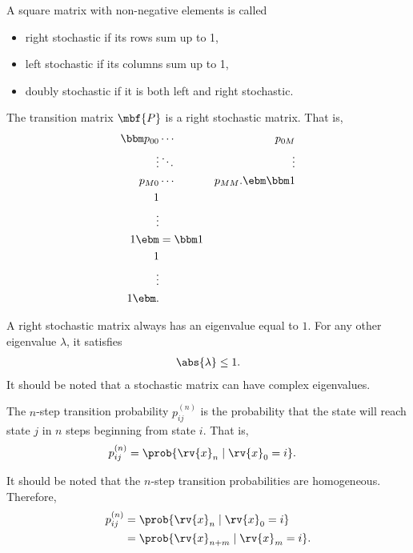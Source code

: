 \begin{definitionBox}
    A square matrix with non-negative elements is called 
    \begin{itemize}
        \item right stochastic if its rows sum up to 1,
        \item left stochastic if its columns sum up to 1,
        \item doubly stochastic if it is both left and right stochastic.
    \end{itemize}
\end{definitionBox}
\begin{property}
    The transition matrix $\mbf{P}$ is a right stochastic matrix. That is,
    \begin{align}
        \bbm p_{00} & \cdots & p_{0M}\\
        \vdots & \ddots & \vdots\\
        p_{M0} & \cdots & p_{MM}.
        \ebm
        \bbm 1\\1\\\vdots\\ 1 \ebm
        &=
        \bbm 1\\1\\\vdots\\1 \ebm.
    \end{align}
\end{property}

\begin{theoremBox}
    A right stochastic matrix always has an eigenvalue equal to $1$. For any other eigenvalue $\lambda$, it satisfies 
    \begin{align}
        \abs{ \lambda} \leq 1.
    \end{align}
    It should be noted that a stochastic matrix can have complex eigenvalues.     
\end{theoremBox}

\begin{definitionBox}
    The $n$-step transition probability $p_{ij}^{(n)}$ is the probability that the state will reach state $j$ in $n$ steps beginning from state $i$. That is,
    \begin{align}
        p_{ij}^{(n)} &= \prob{\rv{x}_{n}\mid \rv{x}_{0}=i}.
    \end{align}
\end{definitionBox}
\begin{remarkBox}
    It should be noted that the $n$-step transition probabilities are homogeneous. Therefore,
    \begin{align}
        p_{ij}^{(n)} 
        &= \prob{\rv{x}_{n}\mid \rv{x}_{0}=i}\\
        &= \prob{\rv{x}_{n+m}\mid \rv{x}_{m}=i}.        
    \end{align}
\end{remarkBox}

